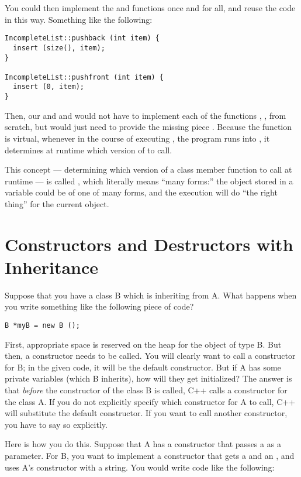 You could then implement the  and 
functions once and for all, and reuse the code in this way. 
Something like the following:

\begin{verbatim}
IncompleteList::pushback (int item) {
  insert (size(), item);
}

IncompleteList::pushfront (int item) {
  insert (0, item);
}
\end{verbatim}
Then, our  and  and
 would not have to implement each of the functions
, , from scratch, but would just
need to provide the missing piece .
Because the  function is virtual,
whenever in the course of executing ,
the program runs into ,
it determines at runtime which version of  to call. 

This concept --- determining which version of a class member function
to call at runtime --- is called , which literally
means ``many forms:'' the object stored in a variable could be of one of
many forms, and the execution will do ``the right thing'' for the
current object.

\section{Constructors and Destructors with Inheritance}

Suppose that you have a class B which is inheriting from A. What
happens when you write something like the following piece of code?

\begin{verbatim}
B *myB = new B ();
\end{verbatim}

First, appropriate space is reserved on the heap for the object of
type B. But then, a constructor needs to be called. You will clearly
want to call a constructor for B; in the given code, it will be the
default constructor.
But if A has some private variables (which B inherits),
how will they get initialized?
The answer is that \emph{before} the constructor of the class B is
called, C++ calls a constructor for the class A.
If you do not explicitly specify which constructor for A to call,
C++ will substitute the default constructor.
If you want to call another constructor, you have to say so explicitly.

Here is how you do this.
Suppose that A has a constructor that passes a  as a parameter.
For B, you want to implement a constructor that gets a 
and an , and uses A's constructor with a string.
You would write code like the following:

